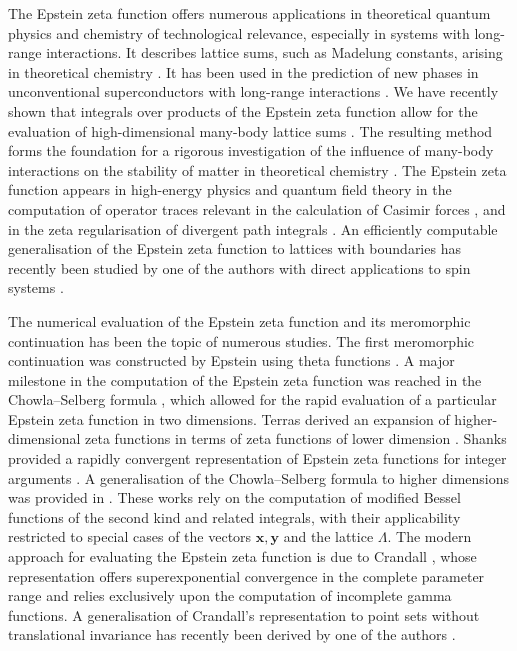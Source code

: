 \documentclass[]{amsart}
\numberwithin{mythm}{section}
\begin{document}
The Epstein zeta function offers numerous applications in theoretical quantum physics and chemistry of technological relevance, especially in systems with long-range interactions. It describes lattice sums, such as Madelung constants, arising in theoretical chemistry \cite{schwerdtfeger100YearsLennardJones2024,emersleben1923zetafunktionenI,emersleben1923zetafunktionenII}. It has been used in the prediction of new phases in unconventional superconductors with long-range interactions \cite{buchheit2023exact}.
We have recently shown that integrals over products of the Epstein zeta function
allow for the evaluation of high-dimensional many-body lattice sums
\cite[Theorem 2.6]{buchheitEpsteinZetaMethod2025}.
The resulting method forms the foundation for a rigorous investigation of the influence of many-body interactions on the stability of matter in theoretical chemistry \cite{robles-navarroExactLatticeSummations2025}.
The Epstein zeta function appears in high-energy physics and quantum field theory in the computation of operator traces relevant in the calculation of Casimir forces
\cite{ambjornPropertiesVacuumMechanical1983}, and in the zeta regularisation of divergent path integrals \cite{hawking1977zeta}. An efficiently computable generalisation of the Epstein zeta function to lattices with boundaries has recently been studied by one of the authors with direct applications to spin systems \cite{buchheitComputationLatticeSums2024}.

The numerical evaluation of the Epstein zeta function and its meromorphic continuation has been the topic of numerous studies. The first meromorphic continuation was constructed by Epstein using theta functions \cite{epstein1903theorieI}. A major milestone in the computation of the Epstein zeta function was reached in the Chowla--Selberg formula \cite{chowla1949epstein}, which allowed for the rapid evaluation of a particular Epstein zeta function in two dimensions. Terras derived an expansion of higher-dimensional zeta functions in terms of zeta functions of lower dimension \cite{terras}. Shanks provided a rapidly convergent representation of Epstein zeta functions for integer arguments \cite{shanksCalculationApplicationsEpstein1975}. A generalisation of the Chowla--Selberg formula to higher dimensions was provided in \cite{elizalde1998multidimensional}. These works rely on the computation of modified Bessel functions of the second kind and related integrals, with their applicability restricted to special cases of the vectors $\bm x,\bm y$ and the lattice $\Lambda$. The modern approach for evaluating the Epstein zeta function is due to Crandall \cite{crandall2012unified}, whose representation offers superexponential convergence in the complete parameter range and relies exclusively upon the computation of incomplete gamma functions. A generalisation of Crandall's representation to point sets without translational invariance has recently been derived by one of the authors \cite{buchheitComputationLatticeSums2024}.
\end{document}
